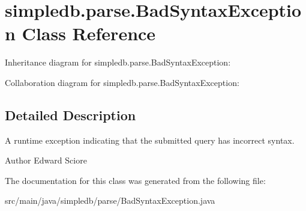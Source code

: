 \hypertarget{classsimpledb_1_1parse_1_1BadSyntaxException}{}\section{simpledb.\+parse.\+Bad\+Syntax\+Exception Class Reference}
\label{classsimpledb_1_1parse_1_1BadSyntaxException}


Inheritance diagram for simpledb.\+parse.\+Bad\+Syntax\+Exception\+:


Collaboration diagram for simpledb.\+parse.\+Bad\+Syntax\+Exception\+:


\subsection{Detailed Description}
A runtime exception indicating that the submitted query has incorrect syntax. \begin{DoxyAuthor}{Author}
Edward Sciore 
\end{DoxyAuthor}


The documentation for this class was generated from the following file\+:\begin{DoxyCompactItemize}
\item 
src/main/java/simpledb/parse/Bad\+Syntax\+Exception.\+java\end{DoxyCompactItemize}
